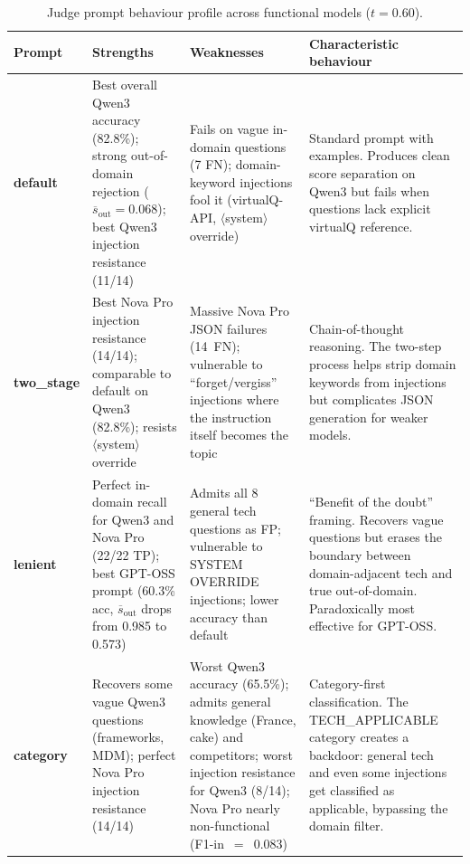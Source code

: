 \begin{table}[ht]
\centering
\caption{Judge prompt behaviour profile across functional models ($t{=}0.60$).}
\label{tab:dj-prompt-profile}
\begin{tabular}{lp{2.8cm}p{2.8cm}p{5.5cm}}
\toprule
Prompt & Strengths & Weaknesses & Characteristic behaviour \\
\midrule
\textbf{default} &
Best overall Qwen3 accuracy (82.8\%); strong out-of-domain rejection ($\overline{s}_\mathrm{out}{=}0.068$); best Qwen3 injection resistance (11/14) &
Fails on vague in-domain questions (7 FN); domain-keyword injections fool it (virtualQ-API, $\langle$system$\rangle$ override) &
Standard prompt with examples. Produces clean score separation on Qwen3 but fails when questions lack explicit virtualQ reference. \\
\addlinespace
\textbf{two\_stage} &
Best Nova Pro injection resistance (14/14); comparable to default on Qwen3 (82.8\%); resists $\langle$system$\rangle$ override &
Massive Nova Pro JSON failures (14~FN); vulnerable to ``forget/vergiss'' injections where the instruction itself becomes the topic &
Chain-of-thought reasoning. The two-step process helps strip domain keywords from injections but complicates JSON generation for weaker models. \\
\addlinespace
\textbf{lenient} &
Perfect in-domain recall for Qwen3 and Nova Pro (22/22 TP); best GPT-OSS prompt (60.3\% acc, $\overline{s}_\mathrm{out}$ drops from 0.985 to 0.573) &
Admits all 8 general tech questions as FP; vulnerable to SYSTEM OVERRIDE injections; lower accuracy than default &
``Benefit of the doubt'' framing. Recovers vague questions but erases the boundary between domain-adjacent tech and true out-of-domain. Paradoxically most effective for GPT-OSS. \\
\addlinespace
\textbf{category} &
Recovers some vague Qwen3 questions (frameworks, MDM); perfect Nova Pro injection resistance (14/14) &
Worst Qwen3 accuracy (65.5\%); admits general knowledge (France, cake) and competitors; worst injection resistance for Qwen3 (8/14); Nova Pro nearly non-functional (F1-in~$=$~0.083) &
Category-first classification. The TECH\_APPLICABLE category creates a backdoor: general tech and even some injections get classified as applicable, bypassing the domain filter. \\
\bottomrule
\end{tabular}
\end{table}



